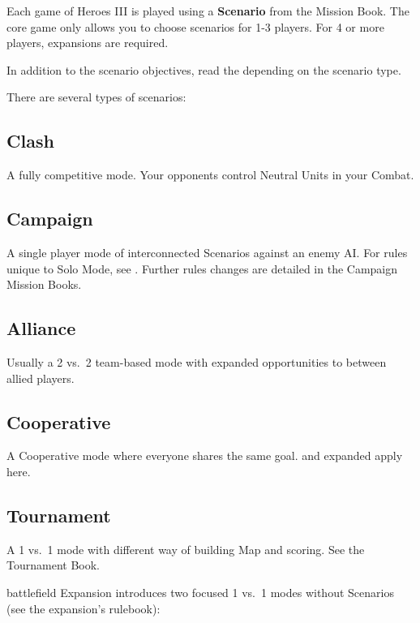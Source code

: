 
\begin{multicols*}{2}

Each game of Heroes III is played using a \textbf{Scenario} from the Mission Book.
The core game only allows you to choose scenarios for 1-3 players. For 4 or more players, expansions are required.\par
In addition to the scenario objectives, read the  depending on the scenario type.\par
There are several types of scenarios:

\subsection*{Clash}
A fully competitive mode.
Your opponents control Neutral Units in your Combat.

\subsection*{Campaign}
A single player mode of interconnected Scenarios against an enemy AI.
For rules unique to Solo Mode, see .
Further rules changes are detailed in the Campaign Mission Books.

\subsection*{Alliance}
Usually a 2 vs.~2 team-based mode with expanded opportunities to  between allied players.

\subsection*{Cooperative}
A Cooperative mode where everyone shares the same goal.  and expanded  apply here.

\subsection*{Tournament}
A 1 vs.~1 mode with different way of building Map and scoring. See the Tournament Book.

\columnbreak

\begin{expansion}[before=\vspace*{-10mm}]{battlefield}
 Expansion introduces two focused 1 vs.~1 modes without Scenarios (see the expansion's rulebook):


\end{expansion}
\end{multicols*}
